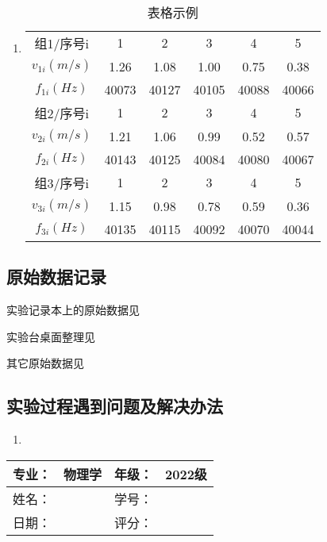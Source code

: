 \documentclass[dvipsnames, svgnames,a4paper,11pt]{article}
\begin{document}
	\subsubsection{}
	\begin{enumerate}
		\item \begin{table}[h]
			\centering
			\caption{表格示例}
			\label{tab:tab1}
			\begin{tabular}{|c|c|c|c|c|c|}
				\hline
				组1/序号i & 1 & 2 & 3 & 4 & 5 \\
				$v_{1i}(m/s)$ & 1.26 & 1.08 & 1.00 & 0.75 & 0.38 \\
				$f_{1i}(Hz)$ & 40073 & 40127 & 40105 & 40088 & 40066 \\
				\hline
				组2/序号i & 1 & 2 & 3 & 4 & 5 \\
				$v_{2i}(m/s)$ & 1.21 & 1.06 & 0.99 & 0.52 & 0.57 \\
				$f_{2i}(Hz)$ & 40143 & 40125 & 40084 & 40080 & 40067 \\
				\hline
				组3/序号i & 1 & 2 & 3 & 4 & 5 \\
				$v_{3i}(m/s)$ & 1.15 & 0.98 & 0.78 & 0.59 & 0.36 \\
				$f_{3i}(Hz)$ & 40135 & 40115 & 40092 & 40070 & 40044 \\
				\hline
			\end{tabular}
		\end{table}		
	\end{enumerate}
	
	
	\clearpage
	\subsection{原始数据记录}
	实验记录本上的原始数据见%
	
	实验台桌面整理见%
	
	其它原始数据见%
	
	\subsection{实验过程遇到问题及解决办法}
	\begin{enumerate}
		\item 
	\end{enumerate}
	
	
	
	\clearpage
	
	\begin{table}
		\renewcommand\arraystretch{1.7}
		\begin{tabularx}{\textwidth}{|X|X|X|X|}
			\hline
			专业：& 物理学 &年级：& 2022级\\
			\hline
			姓名： &  & 学号：& \\
			\hline
			日期：&  & 评分： &\\
			\hline
		\end{tabularx}
	\end{table}
	
\end{document}
